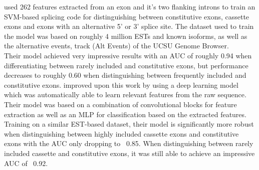 \cite{buschhertel} used 262 features extracted from an exon and it's two flanking introns to train an SVM-based splicing code for distinguishing between constitutive exons, cassette exons and exons with an alternative 5' or 3' splice site. The dataset used to train the model was based on roughly 4 million ESTs and known isoforms, as well as the alternative events, track (Alt Events) of the UCSU Genome Browser.\\
Their model achieved very impressive results with an AUC of roughly 0.94 when differentiating between rarely included and constitutive exons, but performance decreases to roughly 0.60 when distinguishing between frequently included and constitutive exons. \cite{dsc} improved upon this work by using a deep learning model which was automatically able to learn relevant features from the raw sequence. Their model was based on a combination of convolutional blocks for feature extraction as well as an MLP for classification based on the extracted features. Training on a similar EST-based dataset, their model is significantly more robust when distinguishing between highly included cassette exons and constitutive exons with the AUC only dropping to ~0.85. When distinguishing between rarely included cassette and constitutive exons, it was still able to achieve an impressive AUC of ~0.92.
